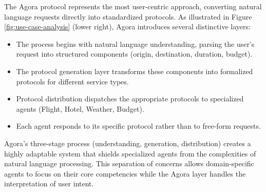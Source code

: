 \documentclass[10pt,preprint]{article}
\begin{document}
The Agora protocol represents the most user-centric approach, converting natural language requests directly into standardized protocols. As illustrated in Figure \ref{fig:use-case-analysis} (lower right), Agora introduces several distinctive layers:
\begin{itemize}
    \item The process begins with natural language understanding, parsing the user's request into structured components (origin, destination, duration, budget).
    \item The protocol generation layer transforms these components into formalized protocols for different service types.
    \item Protocol distribution dispatches the appropriate protocols to specialized agents (Flight, Hotel, Weather, Budget).
    \item Each agent responds to its specific protocol rather than to free-form requests.
\end{itemize}

Agora's three-stage process (understanding, generation, distribution) creates a highly adaptable system that shields specialized agents from the complexities of natural language processing. This separation of concerns allows domain-specific agents to focus on their core competencies while the Agora layer handles the interpretation of user intent.

\end{document}
